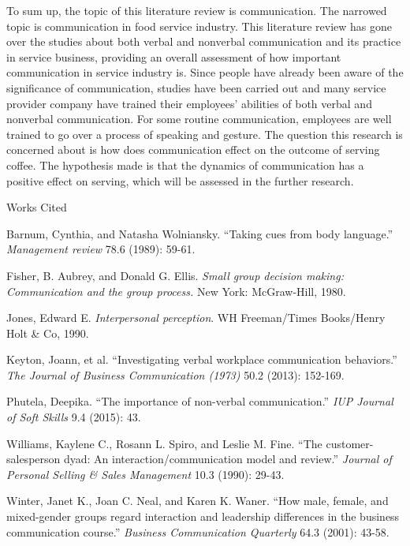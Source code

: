 \documentclass[12pt]{article}
\newcommand{\bibent}{\noindent \hangindent 40pt}
\newenvironment{workscited}{\newpage \begin{center} Works Cited \end{center}}{\newpage }
\begin{document}
\begin{flushleft}
To sum up, the topic of this literature review is communication. The narrowed
topic is communication in food service industry.
This literature review has gone over the studies about both verbal
and nonverbal communication and its practice in service business, providing an
overall assessment of how important communication in service industry is.
Since people have already been aware of the significance of communication, studies
have been carried out and many service provider company have trained their
employees' abilities of both verbal and nonverbal communication.
For some routine communication, employees are well trained to go over a process
of speaking and gesture.
The question this research is concerned about is how does communication effect
on the outcome of serving coffee.
The hypothesis made is that the dynamics of communication has a
positive effect on serving, which will be assessed in the further research.

\newpage
\begin{workscited}


  
\bibent
Barnum, Cynthia, and Natasha Wolniansky. ``Taking cues from body language.'' \textit{Management review} 78.6 (1989): 59-61.

\bibent
Fisher, B. Aubrey, and Donald G. Ellis. \textit{Small group decision making: Communication and the group process.} New York: McGraw-Hill, 1980.

\bibent
Jones, Edward E. \textit{Interpersonal perception}. WH Freeman/Times Books/Henry Holt \& Co, 1990.

\bibent
Keyton, Joann, et al. ``Investigating verbal workplace communication
behaviors.'' \textit{The Journal of Business Communication (1973) } 50.2 (2013): 152-169. 

\bibent
Phutela, Deepika. ``The importance of non-verbal communication.'' \textit{IUP Journal of Soft Skills} 9.4 (2015): 43.

\bibent
Williams, Kaylene C., Rosann L. Spiro, and Leslie M. Fine. ``The customer-salesperson dyad: An interaction/communication model and review.'' \textit{Journal of Personal Selling \& Sales Management} 10.3 (1990): 29-43.

\bibent
Winter, Janet K., Joan C. Neal, and Karen K. Waner. ``How male, female, and mixed-gender groups regard interaction and leadership differences in the business communication course.''  \textit{Business Communication Quarterly} 64.3 (2001): 43-58.


\end{workscited}

\end{flushleft}
\end{document}
